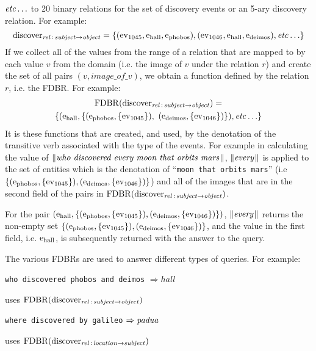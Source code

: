 \documentclass[../main.tex]{subfiles}
\begin{document}
\begin{refsection}
\noindent $\etc$ to 20 binary relations for  the set of discovery events or an 5-ary discovery relation. For example:
\begin{equation*}
	\relationn{discover}{subject}{object} = \{(\event{1045}, \entity{hall}, \entity{phobos}), (\event{1046}, \entity{hall}, \entity{deimos}), \etc\}
\end{equation*}
If we collect all of the values from the range of a relation that are mapped to by each value $v$ from the domain (i.e. the image of $v$ under the relation $r$) and create the set of all pairs $(v, image\_of\_v)$, we obtain a function defined by the relation $r$, i.e. the FDBR. For example:
\begin{multline*}
	\FDBR{\relationn{discover}{subject}{object}} = \\ \{( \entity{hall}, \{(\entity{phobos}, \{\event{1045}\}),\ (\entity{deimos}, \{\event{1046}\}) \}),\etc\}
\end{multline*}
It is these functions that are created, and used, by the denotation of the transitive verb associated with the type of the events. For example in calculating the value of $\meaningof{who discovered every moon that orbits mars}$, $\meaningof{every}$ is applied to the set of entities which is the denotation of ``\texttt{moon that orbits mars}'' (i.e $\{ (\entity{phobos}, \{\event{1045}\}),\\ (\entity{deimos}, \{\event{1046}\})\}$) and all of the images that are in the second field of the pairs in $\FDBR{\relationn{discover}{subject}{object}}$.

For the pair $(\entity{hall}, \{(\entity{phobos}, \{\event{1045}\}), (\entity{deimos}, \{\event{1046}\})\})$, $\meaningof{every}$ returns the non-empty set $\{(\entity{phobos}, \{\event{1045}\}), (\entity{deimos}, \{\event{1046}\})\}$, and the value in the first field, i.e. $\entity{hall}$, is subsequently returned with the answer to the query.

The various FDBRs are used to answer different types of queries. For example: \\

\hspace{4em}\parbox{\linewidth}{
\texttt{who discovered phobos and deimos} $\Rightarrow hall$

\hspace{2em} uses $\FDBR{\relationn{discover}{subject}{object}}$

\texttt{where discovered by galileo} $\Rightarrow \opit{padua}$

\hspace{2em} uses $\FDBR{\relationn{discover}{location}{subject}}$

}
\end{refsection}
\end{document}
